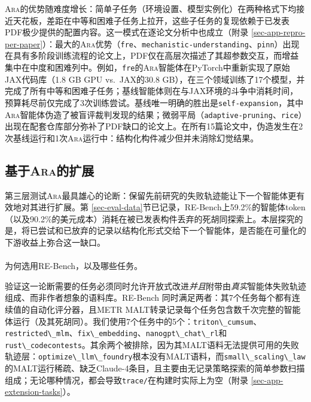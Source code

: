 \documentclass[
]{article}
\makeatletter
\let\oldparagraph\paragraph
\renewcommand{\paragraph}{
    \@ifstar
      \xxxParagraphStar
      \xxxParagraphNoStar
  }
\newcommand{\xxxParagraphStar}[1]{\oldparagraph*{#1}\mbox{}}
\newcommand{\xxxParagraphNoStar}[1]{\oldparagraph{#1}\mbox{}}
\newcommand{\passthrough}[1]{#1}
\theoremstyle{definition}
\newcommand{\ara}{\textsc{Ara}}
\makeatother
\begin{document}
\ara{}的优势随难度增长：简单子任务（环境设置、模型实例化）在两种格式下均接近天花板，差距在中等和困难子任务上拉开，这些子任务的复现依赖于已发表PDF极少提供的配置内容。这一模式在逐论文分析中也成立（附录
\ref{sec-app-repro-per-paper}）：最大的\ara{}优势（\passthrough{\lstinline!fre!}、\passthrough{\lstinline!mechanistic-understanding!}、\passthrough{\lstinline!pinn!}）出现在具有多阶段训练流程的论文上，PDF仅在高层次描述了其超参数交互，而增益集中在中度和困难列中。例如，\passthrough{\lstinline!fre!}的\ara{}智能体在PyTorch中重新实现了原始JAX代码库（1.8
GB GPU vs.~JAX的30.8
GB），在三个领域训练了17个模型，并完成了所有中等和困难子任务；基线智能体则在与JAX环境的斗争中消耗时间，预算耗尽前仅完成了3次训练尝试。基线唯一明确的胜出是\passthrough{\lstinline!self-expansion!}，其中\ara{}智能体伪造了被盲评裁判发现的结果；微弱平局（\passthrough{\lstinline!adaptive-pruning!}、\passthrough{\lstinline!rice!}）出现在配套仓库部分弥补了PDF缺口的论文上。在所有15篇论文中，伪造发生在2次基线运行和1次\ara{}运行中：结构化构件减少但并未消除幻觉结果。

\subsection{\texorpdfstring{基于\ara{}的扩展}{基于的扩展}}\label{sec-eval-extension}

第三层测试\ara{}最具雄心的论断：保留先前研究的失败轨迹能让下一个智能体更有效地对其进行扩展。第
\ref{sec-eval-data}节已记录，RE-Bench上59.2\%的智能体token（以及90.2\%的美元成本）消耗在被已发表构件丢弃的死胡同探索上。本层探究的是，将已尝试和已放弃的记录以结构化形式交给下一个智能体，是否能在可量化的下游收益上弥合这一缺口。

\paragraph{为何选用RE-Bench，以及哪些任务。}\label{ux4e3aux4f55ux9009ux7528re-benchux4ee5ux53caux54eaux4e9bux4efbux52a1}

验证这一论断需要的任务必须同时允许开放式改进\emph{并且}附带由\emph{真实}智能体失败轨迹组成、而非作者想象的语料库。RE-Bench
\citep{wijk2025rebench}同时满足两者：其7个任务每个都有连续值的自动化评分器，且METR
MALT转录记录每个任务包含数千次完整的智能体运行（及其死胡同）。我们使用7个任务中的5个：\passthrough{\lstinline!triton\_cumsum!}、\passthrough{\lstinline!restricted\_mlm!}、\passthrough{\lstinline!fix\_embedding!}、\passthrough{\lstinline!nanogpt\_chat\_rl!}和\passthrough{\lstinline!rust\_codecontests!}。其余两个被排除，因为其MALT语料无法提供可用的失败轨迹层：\passthrough{\lstinline!optimize\_llm\_foundry!}根本没有MALT语料，而\passthrough{\lstinline!small\_scaling\_law!}的MALT运行稀疏、缺乏Claude-4条目，且主要由无记录策略探索的简单参数扫描组成；无论哪种情况，都会导致\passthrough{\lstinline!trace/!}在构建时实际上为空（附录
\ref{sec-app-extension-tasks}）。
\end{document}
